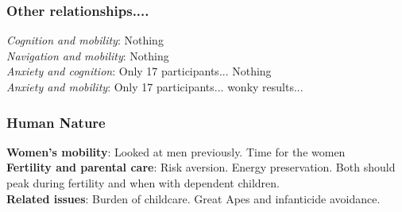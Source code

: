 \documentclass{beamer}
\begin{document}

\begin{frame}

\frametitle{Other relationships....}

\emph{Cognition and mobility}: Nothing\\
\vspace{0.75cm}
\emph{Navigation and mobility}: Nothing\\
\vspace{0.75cm}
\emph{Anxiety and cognition}: Only 17 participants... Nothing\\
\vspace{0.75cm}
\emph{Anxiety and mobility}: Only 17 participants... wonky results...\\

\end{frame}





\begin{frame}

\frametitle{Human Nature}

\textbf{Women's mobility}: Looked at men previously. Time for the women \\
\vspace{0.75cm}
\textbf{Fertility and parental care}: Risk aversion.  Energy preservation. Both should peak during fertility and when with dependent children. \\
\vspace{0.75cm}
\textbf{Related issues}: Burden of childcare.  Great Apes and infanticide avoidance.\\

\end{frame}
\end{document}
